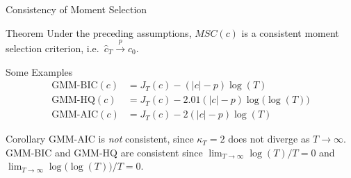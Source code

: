 \begin{frame}{Consistency of Moment Selection}

  \small
\begin{alertblock}{Theorem}
	Under the preceding assumptions, $MSC(c)$ is a consistent moment selection criterion, i.e.\ $\widehat{c}_T \overset{p}{\rightarrow} c_0$.
\end{alertblock}

\begin{block}{Some Examples}
  \vspace{-1em}
  \begin{align*}
    \mbox{GMM-BIC}(c) &= J_T(c) - \left( |c|-p \right)\log(T)\\
    \mbox{GMM-HQ}(c) &= J_T(c) - 2.01\left( |c|-p \right)\log\big(\log(T)\big)\\
    \mbox{GMM-AIC}(c) &= J_T(c) - 2\left( |c|-p \right)\log(T)
  \end{align*}
\end{block}

\begin{alertblock}{Corollary}
  GMM-AIC is \emph{not} consistent, since $\kappa_T = 2$ does not diverge as $T\rightarrow \infty$.
  GMM-BIC and GMM-HQ are consistent since $\lim_{T\rightarrow \infty} \log(T)/T =0$ and $\lim_{T\rightarrow \infty} \log\big(\log(T)\big)/T = 0$.
\end{alertblock}

\end{frame}

